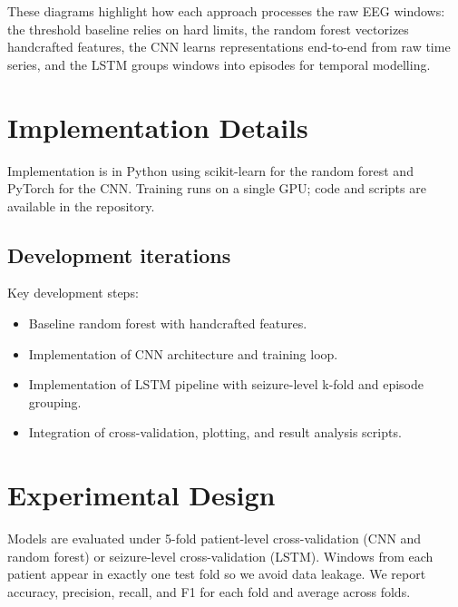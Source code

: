 \documentclass[11pt,a4paper]{article}
\begin{document}
These diagrams highlight how each approach processes the raw EEG windows: the threshold baseline relies on hard limits, the random forest vectorizes handcrafted features, the CNN learns representations end-to-end from raw time series, and the LSTM groups windows into episodes for temporal modelling.


\section{Implementation Details}
Implementation is in Python using scikit-learn for the random forest and PyTorch for the CNN.
Training runs on a single GPU; code and scripts are available in the repository.
\label{sec:implementation}

\subsection{Development iterations}
Key development steps:
\begin{itemize}
\item Baseline random forest with handcrafted features.
\item Implementation of CNN architecture and training loop.
\item Implementation of LSTM pipeline with seizure-level k-fold and episode grouping.
\item Integration of cross-validation, plotting, and result analysis scripts.
\end{itemize}

\section{Experimental Design}
Models are evaluated under 5-fold patient-level cross-validation (CNN and random forest) or seizure-level cross-validation (LSTM).
Windows from each patient appear in exactly one test fold so we avoid data leakage.
We report accuracy, precision, recall, and F1 for each fold and average across folds.
\label{sec:experiments}
\end{document}
